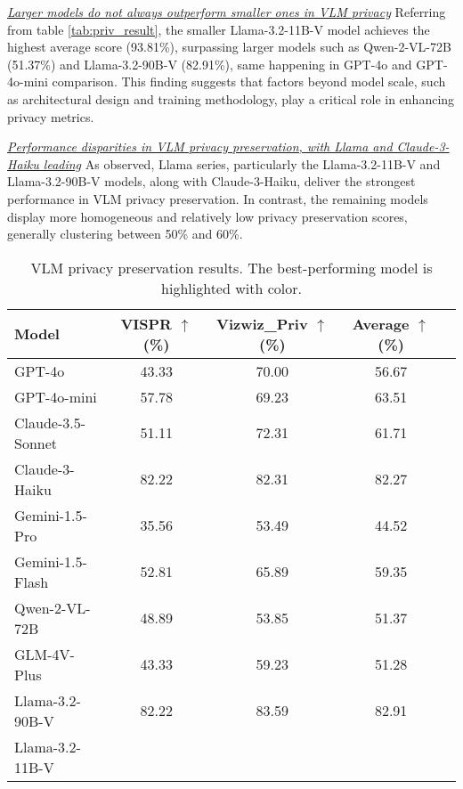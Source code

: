 \textit{\ul{Larger models do not always outperform smaller ones in VLM privacy}} Referring from table \autoref{tab:priv_result},  the smaller Llama-3.2-11B-V model achieves the highest average score (93.81\%), surpassing larger models such as Qwen-2-VL-72B (51.37\%) and Llama-3.2-90B-V (82.91\%), same happening in GPT-4o and GPT-4o-mini comparison. This finding suggests that factors beyond model scale, such as architectural design and training methodology, play a critical role in enhancing privacy metrics.

\textit{\ul{Performance disparities in VLM privacy preservation, with Llama and Claude-3-Haiku leading}} As observed, Llama series, particularly the Llama-3.2-11B-V and Llama-3.2-90B-V models, along with Claude-3-Haiku, deliver the strongest performance in VLM privacy preservation. In contrast, the remaining models display more homogeneous and relatively low privacy preservation scores, generally clustering between 50\% and 60\%.

\begin{table}[ht]
\centering
\small
\caption{VLM privacy preservation results. The best-performing model is highlighted with {} color.}
\renewcommand\arraystretch{1.3}
\begin{tabular}{lcccc} %
\toprule[1pt]
\textbf{Model} & \textbf{VISPR $\uparrow$ (\%)} & \textbf{Vizwiz\_Priv $\uparrow$ (\%)} &\textbf{Average $\uparrow$ (\%)}\\
\midrule
GPT-4o & 43.33 & 70.00 & 56.67 \\ 
GPT-4o-mini & 57.78 & 69.23 & 63.51 \\ 
Claude-3.5-Sonnet & 51.11 & 72.31 & 61.71\\ 
Claude-3-Haiku & 82.22 & 82.31 & 82.27\\ 
Gemini-1.5-Pro & 35.56 & 53.49 & 44.52\\ 
Gemini-1.5-Flash & 52.81 & 65.89 & 59.35\\ 
Qwen-2-VL-72B & 48.89 & 53.85 & 51.37\\ 
GLM-4V-Plus & 43.33 & 59.23 & 51.28\\ 
Llama-3.2-90B-V & 82.22 & 83.59 & 82.91\\ 
Llama-3.2-11B-V & \color{OliveGreen}{\textbf{\underline{92.22}}} & \color{OliveGreen}{\textbf{\underline{95.39}}} & \color{OliveGreen}{\textbf{\underline{93.81}}}\\ 
\bottomrule[1pt]
\end{tabular}
\label{tab:priv_result_VLM}
\end{table}


